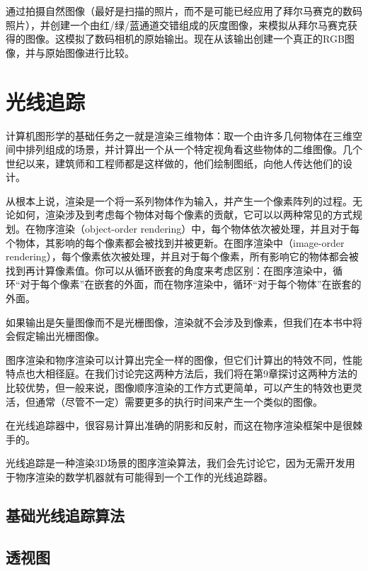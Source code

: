\documentclass[lang=cn,12pt]{elegantbook}
\begin{document}
通过拍摄自然图像（最好是扫描的照片，而不是可能已经应用了拜尔马赛克的数码照片），并创建一个由红/绿/蓝通道交错组成的灰度图像，来模拟从拜尔马赛克获得的图像。这模拟了数码相机的原始输出。现在从该输出创建一个真正的RGB图像，并与原始图像进行比较。

\chapter{光线追踪}

计算机图形学的基础任务之一就是渲染三维物体：取一个由许多几何物体在三维空间中排列组成的场景，并计算出一个从一个特定视角看这些物体的二维图像。几个世纪以来，建筑师和工程师都是这样做的，他们绘制图纸，向他人传达他们的设计。

从根本上说，渲染是一个将一系列物体作为输入，并产生一个像素阵列的过程。无论如何，渲染涉及到考虑每个物体对每个像素的贡献，它可以以两种常见的方式规划。在物序渲染（object-order rendering）中，每个物体依次被处理，并且对于每个物体，其影响的每个像素都会被找到并被更新。在图序渲染中（image-order rendering），每个像素依次被处理，并且对于每个像素，所有影响它的物体都会被找到再计算像素值。你可以从循环嵌套的角度来考虑区别：在图序渲染中，循环“对于每个像素”在嵌套的外面，而在物序渲染中，循环“对于每个物体”在嵌套的外面。

\begin{note}
如果输出是矢量图像而不是光栅图像，渲染就不会涉及到像素，但我们在本书中将会假定输出光栅图像。 
\end{note}

图序渲染和物序渲染可以计算出完全一样的图像，但它们计算出的特效不同，性能特点也大相径庭。在我们讨论完这两种方法后，我们将在第9章探讨这两种方法的比较优势，但一般来说，图像顺序渲染的工作方式更简单，可以产生的特效也更灵活，但通常（尽管不一定）需要更多的执行时间来产生一个类似的图像。

\begin{note}
在光线追踪器中，很容易计算出准确的阴影和反射，而这在物序渲染框架中是很棘手的。 
\end{note}

光线追踪是一种渲染3D场景的图序渲染算法，我们会先讨论它，因为无需开发用于物序渲染的数学机器就有可能得到一个工作的光线追踪器。

\section{基础光线追踪算法}



\section{透视图}
\end{document}
